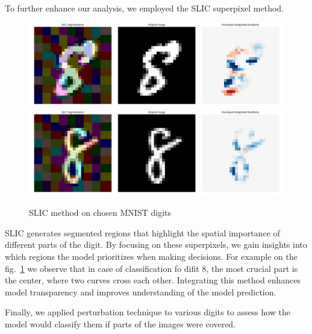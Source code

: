 \documentclass[journal, a4paper]{IEEEtran}
\begin{document}
To further enhance our analysis, we employed the SLIC superpixel method.

\begin{figure}[h]\centering
    \includegraphics[width=.6\linewidth]{img/SLIC/mnist/8}
    \includegraphics[width=.6\linewidth]{img/SLIC/mnist/8_1}
    \caption{SLIC method on chosen MNIST digits}\label{fig:mnist-cnn-slic}
\end{figure}

SLIC generates segmented regions that highlight the spatial importance of different parts of the digit.
By focusing on these superpixels, we gain insights into which regions the model prioritizes when making decisions.
For example on the fig.~\ref{fig:mnist-cnn-slic} we observe that in case of classification fo difit 8, the most crucial part is the center, where two curves cross each other.
Integrating this method enhances model transparency and improves understanding of the model prediction.

Finally, we applied perturbation technique to various digits to assess how the model would classify them if parts of the images were covered.
\end{document}
